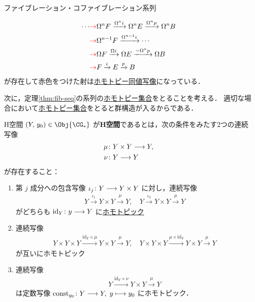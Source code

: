 \documentclass[algtopo_main]{subfiles}
\begin{document}
\begin{mytheo}[label=thm:fib-seq, breakable]{ファイブレーション・コファイブレーション系列}
\begin{enumerate}
\begin{align}
            \cdots &\textcolor{red}{\to} \Omega^n F \xrightarrow{\Omega^n i} \Omega^n E \xrightarrow{\Omega^n p} \Omega^n B \\
            &\textcolor{red}{\to} \Omega^{n-1} F \xrightarrow{\Omega^{n-1} i} \cdots \\
            &\textcolor{red}{\to} \Omega F \xrightarrow{\Omega i} \Omega E \xrightarrow{-\Omega^n p} \Omega B  \\
            &\textcolor{red}{\to} F \xrightarrow{i} E \xrightarrow{p} B
        \end{align}
        が存在して赤色をつけた射は\hyperref[def:homotopy-basic]{ホモトピー同値写像}になっている．
    \end{enumerate}
\end{mytheo}

次に，定理\ref{thm:fib-seq}の系列の\hyperref[def:homotopy-set]{ホモトピー集合}をとることを考える．
適切な場合において\hyperref[def:homotopy-set]{ホモトピー集合}をとると群構造が入るからである．

\begin{mydef}[label=def:Hspace, breakable]{H空間}
    $(Y,\, y_0) \in \Obj{\CG_*}$ が\textbf{H空間}であるとは，次の条件をみたす2つの連続写像
    \begin{align}
        \mu &\colon Y\times Y \longrightarrow Y, \\
        \nu &\colon Y \longrightarrow Y
    \end{align}
    が存在すること：
    \begin{enumerate}
        \item 第 $j$ 成分への包含写像 $\iota_j \colon Y \longrightarrow Y\times Y$ に対し，連続写像
        \begin{align}
            Y \xrightarrow{\iota_1} Y\times Y \xrightarrow{\mu} Y,\quad Y \xrightarrow{\iota_2} Y\times Y \xrightarrow{\mu} Y
        \end{align}
        がどちらも $\mathrm{id}_Y \colon y \longrightarrow Y$ に\hyperref[def:homotopy-basic]{ホモトピック}
        \item 連続写像\begin{align}
            Y \times Y \times Y \xrightarrow{\mathrm{id}_Y \times \mu} Y\times Y \xrightarrow{\mu} Y,\quad Y \times Y \times Y \xrightarrow{\mu \times \mathrm{id}_Y} Y\times Y \xrightarrow{\mu} Y
        \end{align}
        が互いにホモトピック
        \item 連続写像
        \begin{align}
            Y \xrightarrow{\mathrm{id}_Y \times \nu} Y\times Y \xrightarrow{\mu} Y
        \end{align}
        は定数写像 $\text{const}_{y_0} \colon Y \longrightarrow Y,\; y \longmapsto y_0$ にホモトピック．
    \end{enumerate}
\end{mydef}
\end{document}
